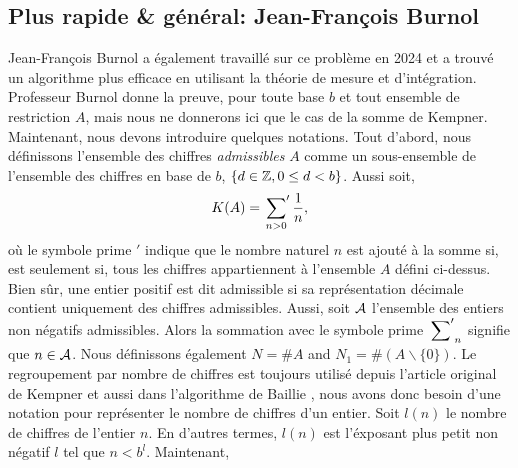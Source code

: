 \subsection{Plus rapide \& g\'en\'eral: Jean-François Burnol}
Jean-François Burnol a également travaillé sur ce problème en 2024 et a trouvé
un algorithme plus efficace en utilisant la théorie de mesure et
d'int\'egration.\\
\indent Professeur Burnol donne la preuve, \cite{burnol} pour toute base $b$ et
tout ensemble de restriction $A$, mais nous ne donnerons ici que le cas de la
somme de Kempner.\\
\indent Maintenant, nous devons introduire quelques notations. Tout d'abord,
nous définissons l'ensemble des chiffres \textit{admissibles} $A$ comme un
sous-ensemble de l'ensemble des chiffres en base de $b$, $\{d\in\mathbb{Z}, 0\le d<b\}$.
Aussi soit,
\begin{equation}
	K(A) = \sideset{}{'}\sum_{n>0}\frac{1}{n},
	\label{eq:kburnol}
\end{equation}
o\`u le symbole prime $'$ indique que le nombre naturel $n$ est ajout\'e \`a la
somme si, est seulement si, tous les chiffres appartiennent à l’ensemble $A$
d\'efini ci-dessus. Bien s\^{u}r, une entier positif est dit admissible si sa
repr\'esentation d\'ecimale contient uniquement des chiffres admissibles. Aussi,
soit $\mathcal{A}$ l'ensemble des entiers non n\'egatifs admissibles. Alors la sommation
avec le symbole prime $\sideset{}{'}\sum_{n}$ signifie que $n\in\mathcal{A}$. Nous d\'efinissons
\'egalement $N = \#A$ and $N_{1} = \#(A \backslash \{0\})$. Le regroupement par
nombre de chiffres est toujours utilis\'e depuis l'article original de Kempner
\cite{kempner} et aussi dans l'algorithme de Baillie \cite{baillie}, nous avons
donc besoin d'une notation pour repr\'esenter le nombre de chiffres d'un entier.
Soit $l(n)$ le nombre de chiffres de l'entier $n$. En d'autres termes, $l(n)$
est l'\'exposant plus petit non n\'egatif $l$ tel que $n<b^{l}$. Maintenant,
